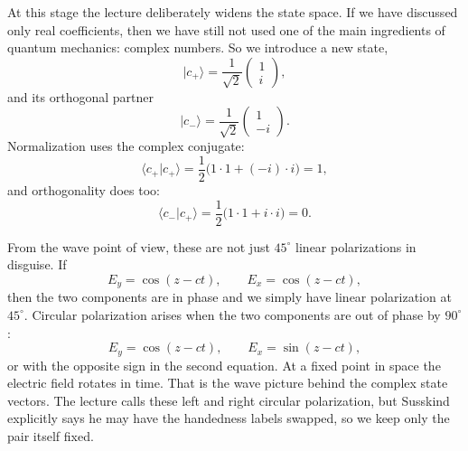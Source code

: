 At this stage the lecture deliberately widens the state space. If we have discussed only real coefficients, then we have still not used one of the main ingredients of quantum mechanics: complex numbers. So we introduce a new state,
\begin{equation}
|c_+\rangle=\frac{1}{\sqrt2}
\begin{pmatrix}
1\\
i
\end{pmatrix},
\end{equation}
and its orthogonal partner
\begin{equation}
|c_-\rangle=\frac{1}{\sqrt2}
\begin{pmatrix}
1\\
-i
\end{pmatrix}.
\end{equation}
Normalization uses the complex conjugate:
\begin{equation}
\langle c_+|c_+\rangle=\frac12\bigl(1\cdot 1+(-i)\cdot i\bigr)=1,
\end{equation}
and orthogonality does too:
\begin{equation}
\langle c_-|c_+\rangle=\frac12\bigl(1\cdot 1+i\cdot i\bigr)=0.
\end{equation}

From the wave point of view, these are not just \(45^\circ\) linear polarizations in disguise. If
\begin{equation}
E_y=\cos(z-ct),
\qquad
E_x=\cos(z-ct),
\end{equation}
then the two components are in phase and we simply have linear polarization at \(45^\circ\). Circular polarization arises when the two components are out of phase by \(90^\circ\):
\begin{equation}
E_y=\cos(z-ct),
\qquad
E_x=\sin(z-ct),
\end{equation}
or with the opposite sign in the second equation. At a fixed point in space the electric field rotates in time. That is the wave picture behind the complex state vectors. The lecture calls these left and right circular polarization, but Susskind explicitly says he may have the handedness labels swapped, so we keep only the pair itself fixed.

